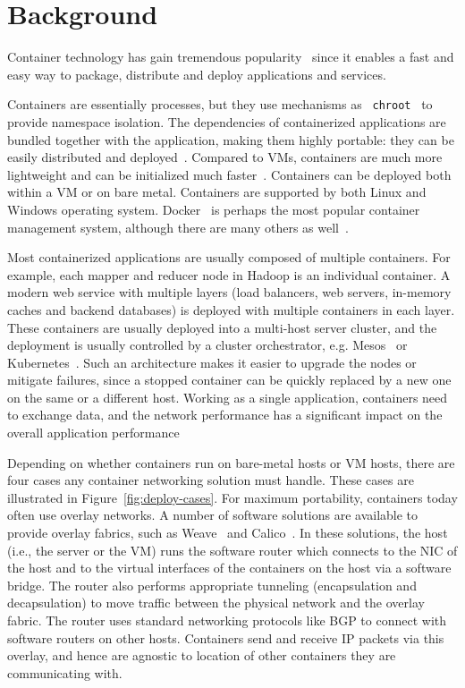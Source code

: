 \section{Background}
\label{sec:background}

Container technology has gain tremendous popularity~\cite{iron-io-300-million,docker-2billion,docker-datadog}
since it enables a fast and easy way to package, distribute and deploy
applications and services. 

Containers are essentially processes, but they use mechanisms as {\tt
chroot}~\cite{chroot} to provide namespace isolation. The dependencies of
containerized applications are bundled together with the application, making
them highly portable: they can be easily distributed and deployed~\cite{docker}.
Compared to VMs, containers are much more lightweight and can be initialized
much faster~\cite{docker:linjournal,jitsu}. Containers can be deployed both within a VM or
on bare metal. Containers are supported by both Linux and Windows operating
system. Docker~\cite{docker} is perhaps the most popular container management
system, although there are many others as well~\cite{coreos,kubernetes}.

Most containerized applications are usually composed of multiple containers.
For example, each mapper and reducer node in Hadoop \cite{hadoop} is an
individual container. A modern web service with multiple layers (load balancers,
web servers, in-memory caches and backend databases) is deployed with multiple
containers in each layer. These containers are usually deployed into a
multi-host server cluster, and the deployment is usually controlled by a cluster
orchestrator, e.g. Mesos~\cite{mesos} or Kubernetes~\cite{kubernetes}. Such an architecture makes it easier to
upgrade the nodes or mitigate failures, since a stopped container can be quickly
replaced by a new one on the same or a different host. Working as a single
application, containers need to exchange data, and the network performance has a
significant impact on the overall application performance~\cite{varys,orchestra,reining,chowdhury}

Depending on whether containers run on bare-metal hosts or VM hosts, there are
four cases any container networking solution must handle. These cases are
illustrated in Figure~\ref{fig:deploy-cases}. For maximum portability,
containers today often use overlay networks.
A number of software solutions are available to provide overlay fabrics,
such as Weave~\cite{weave} and Calico~\cite{calico}. In these solutions, the
host (i.e., the server or the VM) runs the software router which connects to
the NIC of the host and to the virtual interfaces of the
containers on the host via a software bridge. The router also performs appropriate tunneling
(encapsulation and decapsulation) to move traffic between the physical network
and the overlay fabric. The router uses standard networking protocols like BGP
to connect with software routers on other hosts. Containers send and receive IP
packets via this overlay, and hence are agnostic to location of other containers
they are communicating with.

